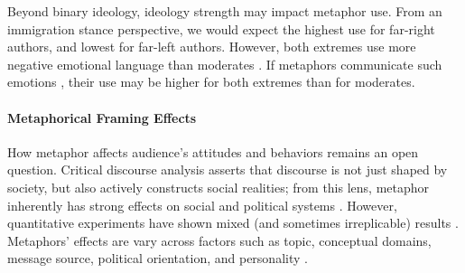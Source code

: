 Beyond binary ideology, ideology strength may impact metaphor use. 
From an immigration stance perspective, we would expect the highest use for far-right authors, and lowest for far-left authors. However, both extremes use more negative emotional language than moderates \citep{alizadeh2019psychology,frimer2019extremists}. If metaphors communicate such emotions \citep{ortony1975metaphors}, their use may be higher for both extremes than for moderates. %

\paragraph{Metaphorical Framing Effects}


How metaphor affects audience's attitudes and behaviors remains an open question. Critical discourse analysis asserts that discourse is not just shaped by society, but also actively constructs social realities; from this lens, metaphor inherently has strong effects on social and political systems \citep{charteris-black_britain_2006,boeynaems_effects_2017}. However, quantitative experiments have shown mixed (and sometimes irreplicable) results \citep{thibodeau_metaphors_2011,steen_when_2014,boeynaems_effects_2017,brugman_metaphorical_2019}. Metaphors' effects are vary across factors such as topic, conceptual domains, message source, political orientation, and personality \citep{bosman_persuasive_1987,mio_metaphor_1997,robins_metaphor_2000,kalmoe_fueling_2014,kalmoe_mobilizing_2019,panzeri_does_2021}.




